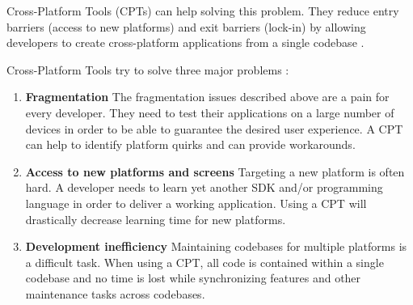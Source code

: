Cross-Platform Tools (CPTs) can help solving this problem. They reduce entry barriers (access to new platforms) and exit barriers (lock-in) by allowing developers to create cross-platform applications from a single codebase \cite{VMCPT:2012}. 

Cross-Platform Tools try to solve three major problems \cite{VMCPT:2012}: 

\begin{enumerate}
    \item \textbf{Fragmentation} The fragmentation issues described above are a pain for every developer. They need to test their applications on a large number of devices in order to be able to guarantee the desired user experience. A CPT can help to identify platform quirks and can provide workarounds. 
    \item \textbf{Access to new platforms and screens} Targeting a new platform is often hard. A developer needs to learn yet another SDK and/or programming language in order to deliver a working application. Using a CPT will drastically decrease learning time for new platforms.
    \item \textbf{Development inefficiency} Maintaining codebases for multiple platforms is a difficult task. When using a CPT, all code is contained within a single codebase and no time is lost while synchronizing features and other maintenance tasks across codebases. 
\end{enumerate}




